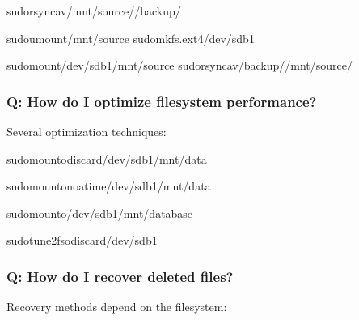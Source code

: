 \documentclass[letterpaper,10pt,english]{sphinxmanual}
\begin{document}
\begin{sphinxVerbatim}[commandchars=\\\{\}]
sudorsync\PYGZhy{}av/mnt/source//backup/

sudoumount/mnt/source
sudomkfs.ext4/dev/sdb1

sudomount/dev/sdb1/mnt/source
sudorsync\PYGZhy{}av/backup//mnt/source/
\end{sphinxVerbatim}


\subsubsection{Q: How do I optimize filesystem performance?}
\label{\detokenize{file-systems:q-how-do-i-optimize-filesystem-performance}}
\sphinxAtStartPar
{} Several optimization techniques:

\begin{sphinxVerbatim}[commandchars=\\\{\}]
sudomount\PYGZhy{}odiscard/dev/sdb1/mnt/data

sudomount\PYGZhy{}onoatime/dev/sdb1/mnt/data

sudomount\PYGZhy{}o/dev/sdb1/mnt/database

sudotune2fs\PYGZhy{}odiscard/dev/sdb1
\end{sphinxVerbatim}


\subsubsection{Q: How do I recover deleted files?}
\label{\detokenize{file-systems:q-how-do-i-recover-deleted-files}}
\sphinxAtStartPar
{} Recovery methods depend on the filesystem:
\end{document}
